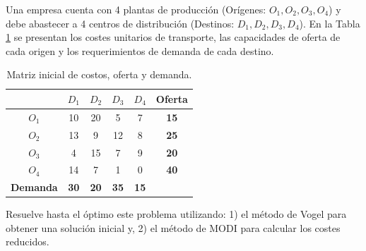 Una empresa cuenta con 4 plantas de producción (Orígenes: $O_1, O_2, O_3, O_4$) y debe abastecer a 4 centros de distribución (Destinos: $D_1, D_2, D_3, D_4$). En la Tabla \ref{tab:enunciado} se presentan los costes unitarios de transporte, las capacidades de oferta de cada origen y los requerimientos de demanda de cada destino.

\begin{table}[htbp]
\centering
\caption{Matriz inicial de costos, oferta y demanda.}
\label{tab:enunciado}
\begin{tabular}{cccccc}
\toprule
& $D_1$ & $D_2$ & $D_3$ & $D_4$ & \textbf{Oferta} \\
\midrule
$O_1$ & 10 & 20 & 5  & 7  & \textbf{15} \\
$O_2$ & 13 & 9  & 12 & 8  & \textbf{25} \\
$O_3$ & 4  & 15 & 7  & 9  & \textbf{20} \\
$O_4$ & 14 & 7  & 1  & 0  & \textbf{40} \\
\midrule
\textbf{Demanda} & \textbf{30} & \textbf{20} & \textbf{35} & \textbf{15} &  \\
\bottomrule
\end{tabular}
\end{table}

Resuelve hasta el óptimo este problema utilizando: 1) el método de Vogel para obtener una solución inicial y, 2) el método de MODI para calcular los costes reducidos.
